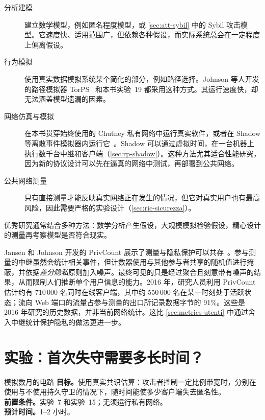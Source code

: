 \begin{description}
  \item[分析建模] 建立数学模型，例如匿名程度模型，或 \cref{sec:att-sybil} 中的 Sybil 攻击模型。它速度快、适用范围广，但依赖各种假设，而实际系统总会在一定程度上偏离假设。
  \item[行为模拟] 使用真实数据模拟系统某个简化的部分，例如路径选择。Johnson 等人开发的路径模拟器 TorPS~\cite{johnson2013users} 和本书实验~19 都采用这种方式。其运行速度快，却无法涵盖模型遗漏的因素。
  \item[网络仿真与模拟] 在本书贯穿始终使用的 Chutney 私有网络中运行真实软件，或者在 Shadow 等离散事件模拟器内运行它~\cite{jansen2012shadow}。Shadow 可以通过虚拟时间，在一台机器上执行数千台中继和客户端（\cref{sec:rp-shadow}）。这种方法尤其适合性能研究，因为新的协议设计可以先在逼真的网络中测试，再部署到公共网络。
  \item[公共网络测量] 只有直接测量才能反映真实网络正在发生的情况，但它对真实用户也有最高风险，因此需要严格的实验设计（\cref{sec:ric-sicurezza}）。
\end{description}
优秀研究通常结合多种方法：数学分析产生假设，大规模模拟检验假设，精心设计的测量再考察模型是否符合现实。

\begin{approfondimento}[在不观察个体的情况下测量]
Jansen 和 Johnson 开发的 PrivCount 展示了测量与隐私保护可以共存~\cite{jansen2016privcount}。参与测量的中继虽然会统计相关事件，但计数器使用与其他参与者共享的随机值进行掩蔽，并依据\emph{差分隐私}原则加入噪声。最终可见的只是经过聚合且刻意带有噪声的结果，从而限制人们推断单个用户信息的能力。2016 年，研究人员利用 PrivCount 估计约有 710\,000 名同时在线客户端，其中约 550\,000 名在某一时刻处于活跃状态；流向 Web 端口的流量占参与测量的出口所记录数据字节的 91\%。这些是 2016 年研究的历史数据，并非当前网络统计。这比 \cref{sec:metrics-utenti} 中通过舍入中继统计保护隐私的做法更进一步。
\end{approfondimento}

\section{实验：首次失守需要多长时间？}\label{sec:lab-ricerca}

\begin{laboratorio}[19]{模拟数月的电路}
\textbf{目标。}使用真实共识估算：攻击者控制一定比例带宽时，分别在使用与不使用持久守卫的情况下，随时间能使多少客户端失去匿名性。\\
\textbf{前置条件。}实验~7 和实验~15；无须运行私有网络。\\
\textbf{预计时间。}1--2 小时。
\end{laboratorio}

